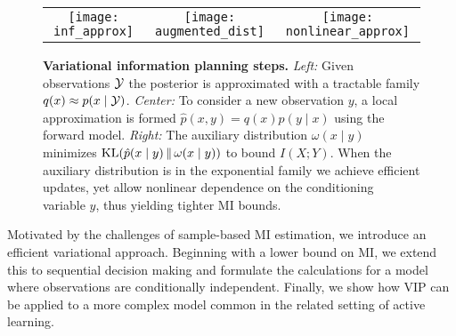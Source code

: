 \begin{figure*}[t]
  \centering
  \begin{tabular}{ccc}
    \hspace{-10mm}\texttt{[image: inf\_approx]} &
    \hspace{-10mm}\texttt{[image: augmented\_dist]} &
    \hspace{-10mm}\texttt{[image: nonlinear\_approx]}
  \end{tabular}

  \caption{\small \textbf{Variational information planning steps.}
    \emph{Left:} Given observations $\mathcal{Y}$ the posterior is
    approximated with a tractable family $q(x) \approx p(x\mid
    \mathcal{Y})$.  \emph{Center:} To consider a new observation $y$, a
    local approximation is formed $\hat{p}(x,y) = q(x) p(y \mid x)$
    using the forward model.  \emph{Right:} The auxiliary distribution
    $\omega(x\mid y)$ minimizes $\mathrm{KL}(\hat{p}(x\mid y)\,\|\,\omega(x\mid
      y))$ to bound $I(X;Y)$.  When the auxiliary distribution is in
    the exponential family we achieve efficient updates, yet allow
    nonlinear dependence on the conditioning variable $y$, thus
    yielding tighter MI bounds.}

  \label{fig:approx}
\end{figure*}

Motivated by the challenges of sample-based MI estimation, we
introduce an efficient variational approach.  Beginning with a lower
bound on MI, we extend this to sequential decision making and
formulate the calculations for a model where observations are
conditionally independent.  Finally, we show how VIP can be applied to
a more complex model common in the related setting of active learning.

